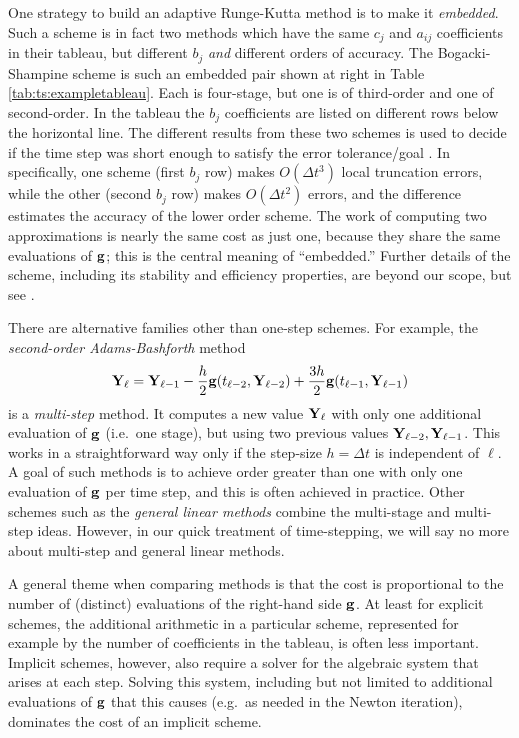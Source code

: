 One strategy to build an adaptive Runge-Kutta method is to make it \emph{embedded}.  Such a scheme is in fact two methods which have the same $c_j$ and $a_{ij}$ coefficients in their tableau, but different $b_j$ \emph{and} different orders of accuracy.  The Bogacki-Shampine scheme \RKthreebs is such an embedded pair shown at right in Table \ref{tab:ts:exampletableau}.  Each is four-stage, but one is of third-order and one of second-order.  In the tableau the $b_j$ coefficients are listed on different rows below the horizontal line.  The different results from these two schemes is used to decide if the time step was short enough to satisfy the error tolerance/goal \citep{Butcher2008}.  In \RKthreebs specifically, one scheme (first $b_j$ row) makes $O(\Delta t^3)$ local truncation errors, while the other (second $b_j$ row) makes $O(\Delta t^2)$ errors, and the difference estimates the accuracy of the lower order scheme.  The work of computing two approximations is nearly the same cost as just one, because they share the same evaluations of $\mathbf{g}$; this is the central meaning of ``embedded.''  Further details of the \RKthreebs scheme, including its stability and efficiency properties, are beyond our scope, but see \citep{BogackiShampine1989}.

There are alternative families other than one-step schemes.  For example, the \emph{second-order Adams-Bashforth} method
\begin{equation}
\mathbf{Y}_\ell = \mathbf{Y}_{\ell-1} - \frac{h}{2} \mathbf{g}(t_{\ell-2},\mathbf{Y}_{\ell-2}) + \frac{3 h}{2} \mathbf{g}(t_{\ell-1},\mathbf{Y}_{\ell-1})  \label{eq:ts:ab2}
\end{equation}
is a \emph{multi-step} method.  It computes a new value $\mathbf{Y}_\ell$ with only one additional evaluation of $\mathbf{g}$ (i.e.~one stage), but using two previous values $\mathbf{Y}_{\ell-2},\mathbf{Y}_{\ell-1}$.  This works in a straightforward way only if the step-size $h=\Delta t$ is independent of $\ell$.  A goal of such methods is to achieve order greater than one with only one evaluation of $\mathbf{g}$ per time step, and this is often achieved in practice.  Other schemes such as the \emph{general linear methods} \citep{Butcher2008} combine the multi-stage and multi-step ideas.  However, in our quick treatment of time-stepping, we will say no more about multi-step and general linear methods.

A general theme when comparing methods is that the cost is proportional to the number of (distinct) evaluations of the right-hand side $\mathbf{g}$.  At least for explicit schemes, the additional arithmetic in a particular scheme, represented for example by the number of coefficients in the tableau, is often less important.  Implicit schemes, however, also require a solver for the algebraic system that arises at each step.  Solving this system, including but not limited to additional evaluations of $\mathbf{g}$ that this causes (e.g.~as needed in the Newton iteration), dominates the cost of an implicit scheme.


